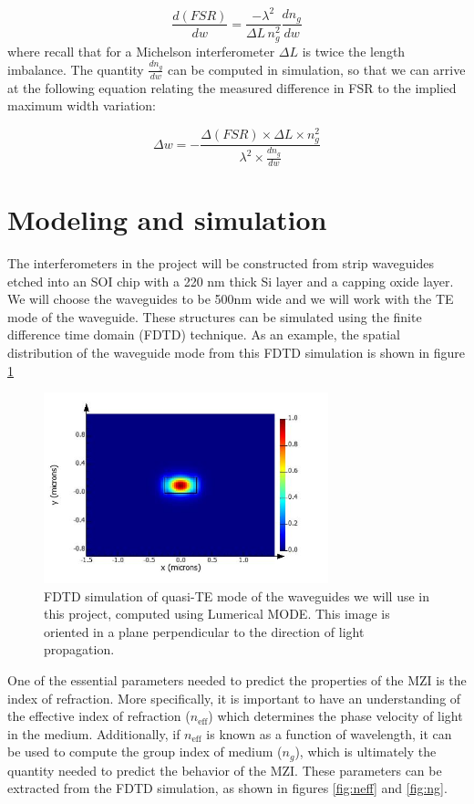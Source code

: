 \documentclass[journal]{IEEEtran}
\begin{document}
\begin{equation}
\frac{d(FSR)}{dw} = \frac{-\lambda^2}{\Delta L \, n_g^2} \frac{dn_g}{dw}
\end{equation}
where recall that for a Michelson interferometer $\Delta L$ is twice the length imbalance. The quantity $\frac{dn_g}{dw}$ can be computed in simulation, so that we can arrive at the following equation relating the measured difference in FSR to the implied maximum width variation:

\begin{equation}
\Delta w = - \frac{\Delta (FSR) \times \Delta L \times n_g^2}{\lambda^2 \times \frac{dn_g}{dw}}
\label{eq:dw}
\end{equation}

\section{Modeling and simulation}
\label{sec:model}


The interferometers in the project will be constructed from strip waveguides etched into an SOI chip with a 220 nm thick Si layer and a capping oxide layer. We will choose the waveguides to be 500nm wide and we will work with the TE mode of the waveguide. These structures can be simulated using the finite difference time domain (FDTD) technique. As an example, the spatial distribution of the waveguide mode from this FDTD simulation is shown in figure \ref{fig:mode}

\begin{figure}[t!]
  \centering
  \includegraphics[width = 3.25in]{fig/waveguide_TE.jpg}
  \caption{FDTD simulation of quasi-TE mode of the waveguides we will use in this project, computed using Lumerical MODE. This image is oriented in a plane perpendicular to the direction of light propagation.}
  \label{fig:mode}
\end{figure}

One of the essential parameters needed to predict the properties of the MZI is the index of refraction. More specifically, it is important to have an understanding of the effective index of refraction ($n_{\text{eff}}$) which determines the phase velocity of light in the medium. Additionally, if $n_{\text{eff}}$ is known as a function of wavelength, it can be used to compute the group index of medium ($n_g$), which is ultimately the quantity needed to predict the behavior of the MZI. These parameters can be extracted from the FDTD simulation, as shown in figures \ref{fig:neff} and \ref{fig:ng}. 
\end{document}
